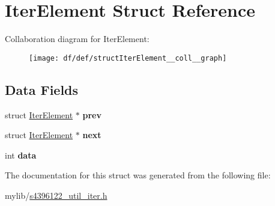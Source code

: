 \hypertarget{structIterElement}{}\section{Iter\+Element Struct Reference}
\label{structIterElement}


Collaboration diagram for Iter\+Element\+:\nopagebreak
\begin{figure}[H]
\begin{center}
\leavevmode
\texttt{[image: df/def/structIterElement\_\_coll\_\_graph]}
\end{center}
\end{figure}
\subsection*{Data Fields}
\begin{DoxyCompactItemize}
\item 
struct \hyperlink{structIterElement}{Iter\+Element} $\ast$ {\bfseries prev}\hypertarget{structIterElement_aec1a59a6a0c589029c4827d3b3330d1d}{}\label{structIterElement_aec1a59a6a0c589029c4827d3b3330d1d}

\item 
struct \hyperlink{structIterElement}{Iter\+Element} $\ast$ {\bfseries next}\hypertarget{structIterElement_a99626d5b6ad5e8fc976ae43a697377c0}{}\label{structIterElement_a99626d5b6ad5e8fc976ae43a697377c0}

\item 
int {\bfseries data}\hypertarget{structIterElement_a3540e69a9cf020bfbeee8611d056e66e}{}\label{structIterElement_a3540e69a9cf020bfbeee8611d056e66e}

\end{DoxyCompactItemize}


The documentation for this struct was generated from the following file\+:\begin{DoxyCompactItemize}
\item 
mylib/\hyperlink{s4396122__util__iter_8h}{s4396122\+\_\+util\+\_\+iter.\+h}\end{DoxyCompactItemize}
